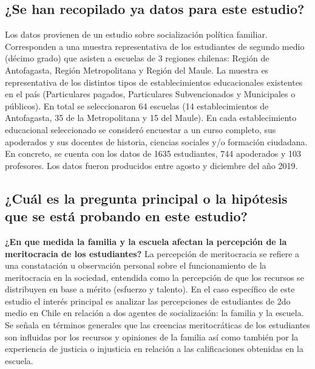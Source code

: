 \documentclass[
  12pt,
]{article}
\begin{document}
\hypertarget{se-han-recopilado-ya-datos-para-este-estudio}{%
\subsection{¿Se han recopilado ya datos para este
estudio?}\label{se-han-recopilado-ya-datos-para-este-estudio}}

Los datos provienen de un estudio sobre socialización política familiar.
Corresponden a una muestra representativa de los estudiantes de segundo
medio (décimo grado) que asisten a escuelas de 3 regiones chilenas:
Región de Antofagasta, Región Metropolitana y Región del Maule. La
muestra es representativa de los distintos tipos de establecimientos
educacionales existentes en el país (Particulares pagados, Particulares
Subvencionados y Municipales o públicos). En total se seleccionaron 64
escuelas (14 establecimientos de Antofagasta, 35 de la Metropolitana y
15 del Maule). En cada establecimiento educacional seleccionado se
consideró encuestar a un curso completo, sus apoderados y sus docentes
de historia, ciencias sociales y/o formación ciudadana. En concreto, se
cuenta con los datos de 1635 estudiantes, 744 apoderados y 103
profesores. Los datos fueron producidos entre agosto y diciembre del año
2019.

\hypertarget{cuuxe1l-es-la-pregunta-principal-o-la-hipuxf3tesis-que-se-estuxe1-probando-en-este-estudio}{%
\subsection{¿Cuál es la pregunta principal o la hipótesis que se está
probando en este
estudio?}\label{cuuxe1l-es-la-pregunta-principal-o-la-hipuxf3tesis-que-se-estuxe1-probando-en-este-estudio}}

\textbf{¿En que medida la familia y la escuela afectan la percepción de
la meritocracia de los estudiantes?} La percepción de meritocracia se
refiere a una constatación u observación personal sobre el
funcionamiento de la meritocracia en la sociedad, entendida como la
percepción de que los recursos se distribuyen en base a mérito (esfuerzo
y talento). En el caso específico de este estudio el interés principal
es analizar las percepciones de estudiantes de 2do medio en Chile en
relación a dos agentes de socialización: la familia y la escuela. Se
señala en términos generales que las creencias meritocráticas de los
estudiantes son influidas por los recursos y opiniones de la familia así
como también por la experiencia de justicia o injusticia en relación a
las calificaciones obtenidas en la escuela.
\end{document}
